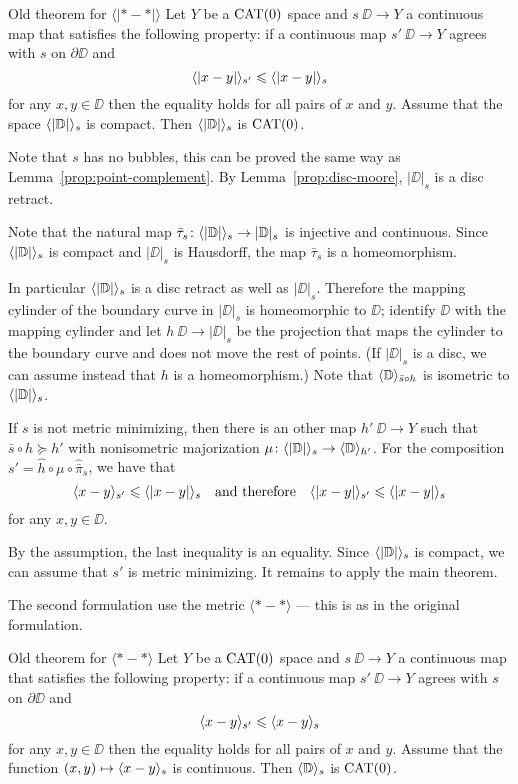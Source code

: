\begin{thm}{Old theorem for $\bm{\langle|{*}-{*}|\rangle}$}\label{thm:old1}
Let $Y$ be a $\mathop{\rm CAT}\nolimits(0)$ space and $s\:\DD\to Y$ a continuous map that satisfies the following property: 
if a continuous map $s'\:\DD\to Y$ agrees with $s$ on $\partial\DD$ and
\[\langle|x-y|\rangle_{s'}\leqslant \langle|x-y|\rangle_{s}\]
for any $x,y\in \DD$
then the equality holds for all pairs of $x$ and $y$.
Assume that the space $\langle|\mathbb{D}|\rangle_s$ is compact.
Then $\langle|\mathbb{D}|\rangle_s$ is $\mathop{\rm CAT}\nolimits(0)$.
\end{thm}

Note that $s$ has no bubbles, this can be proved the same way as Lemma~\ref{prop:point-complement}.
By Lemma~\ref{prop:disc-moore},  $|\DD|_s$ is a disc retract.

Note that the natural map $\bar\tau_s\colon\langle|\mathbb{D}|\rangle_s\to |\mathbb{D}|_s$ is injective and continuous.
Since $\langle|\mathbb{D}|\rangle_s$ is compact and $|\DD|_s$ is Hausdorff, the map $\bar\tau_s$ is a homeomorphism.

In particular $\langle|\mathbb{D}|\rangle_s$ is a disc retract as well as $|\DD|_s$.
Therefore the mapping cylinder of the boundary curve in $|\DD|_s$ is homeomorphic to $\DD$;
identify $\DD$ with the mapping cylinder and let $h\:\DD\to|\DD|_s$ be the projection that maps the cylinder to the boundary curve and does not move the rest of points.
(If $|\DD|_s$ is a disc, we can assume instead that $h$ is a homeomorphism.)
Note that $\langle\mathbb{D}\rangle_{\bar s\circ h}$ is isometric to $\langle|\mathbb{D}|\rangle_s$.

If $s$ is not metric minimizing,
then there is an other map $h'\:\DD\to Y$ such that $\bar s\circ h\succcurlyeq h'$ with nonisometric majorization $\mu\colon\langle|\mathbb{D}|\rangle_s\to \langle\mathbb{D}\rangle_{h'}$.
For the composition $s'=\hat h\circ \mu\circ  \hat{\bar \pi}_s$, we have that 
\[\langle x-y\rangle_{s'}\leqslant \langle|x-y|\rangle_{s}\quad\text{and therefore}\quad \langle|x-y|\rangle_{s'}\leqslant \langle|x-y|\rangle_{s}\]
for any $x,y\in\DD$.

By the assumption, the last inequality is an equality.
Since $\langle|\mathbb{D}|\rangle_s$ is compact, we can assume that $s'$ is metric minimizing. %
It remains to apply the main theorem.
\qeds

The second formulation use the metric $\langle{*}-{*}\rangle$ --- this is as in the original formulation.

\begin{thm}{Old theorem for $\bm{\langle{*}-{*}\rangle}$}\label{thm:old2}
Let $Y$ be a $\mathop{\rm CAT}\nolimits(0)$ space and $s\:\DD\to Y$ a continuous map that satisfies the following property: 
if a continuous map $s'\:\DD\to Y$ agrees with $s$ on $\partial\DD$ and
\[\langle x-y\rangle_{s'}\leqslant \langle x-y\rangle_{s}\]
for any $x,y\in \DD$
then the equality holds for all pairs of $x$ and $y$.
Assume that the function $(x,y)\mapsto\langle x-y\rangle_{s}$ is continuous.
Then $\langle\mathbb{D}\rangle_s$ is $\mathop{\rm CAT}\nolimits(0)$.
\end{thm}

